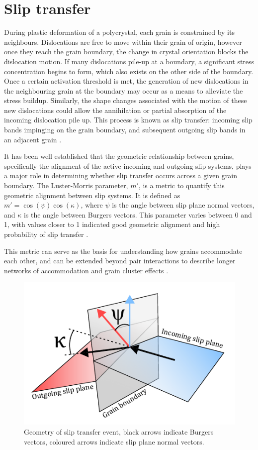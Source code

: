 \section{Slip transfer}
During plastic deformation of a polycrystal, each grain is constrained by its neighbours.
Dislocations are free to move within their grain of origin, however once they reach the grain boundary, the change in crystal orientation blocks the dislocation motion.
If many dislocations pile-up at a boundary, a significant stress concentration begins to form, which also exists on the other side of the boundary.
Once a certain activation threshold is met, the generation of new dislocations in the neighbouring grain at the boundary may occur as a means to alleviate the stress buildup.
Similarly, the shape changes associated with the motion of these new dislocations could allow the annihilation or partial absorption of the incoming dislocation pile up.
This process is known as slip transfer: incoming slip bands impinging on the grain boundary, and subsequent outgoing slip bands in an adjacent grain \cite{hanECCIAnalysisShear2020,cuiInfluenceIrradiationDamage2014,guoMeasurementsStressFields2015}.

It has been well established that the geometric relationship between grains, specifically the alignment of the active incoming and outgoing slip systems, plays a major role in determining whether slip transfer occurs across a given grain boundary.
The Luster-Morris parameter, $m'$, is a metric to quantify this geometric alignment between slip systems.
It is defined as $m' = \cos(\psi)\cos(\kappa)$, where $\psi$ is the angle between slip plane normal vectors, and $\kappa$ is the angle between Burgers vectors.
This parameter varies between 0 and 1, with values closer to 1 indicated good geometric alignment and high probability of slip transfer \cite{nieto-valeirasAssessmentSlipTransfer2024}.

This metric can serve as the basis for understanding how grains accommodate each other, and can be extended beyond pair interactions to describe longer networks of accommodation and grain cluster effects \cite{abdolvandStrongGrainNeighbour2018}.

\begin{figure}[h]
\centering
  \includegraphics[width=\textwidth]{Figures/slipTransfer.pdf}
  \caption{Geometry of slip transfer event, black arrows indicate Burgers vectors, coloured arrows indicate slip plane normal vectors. \label{fig.slipTransfer}}
\end{figure}
